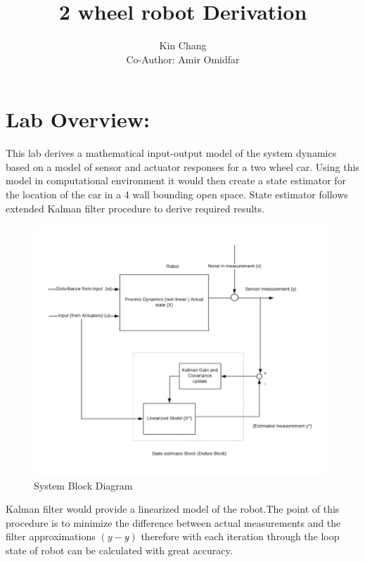\documentclass[12pt, letterpaper]{amsart} %
\author{Kin Chang \\Co-Author: 
Amir Omidfar}
\title{2 wheel robot Derivation}
\numberwithin{equation}{section}
\begin{document}
\maketitle
\pagebreak
\tableofcontents
\pagebreak
\section*{Lab Overview:}
This lab derives a mathematical input-output model of the system dynamics based on a model of sensor and actuator responses for a two wheel car. Using this model in computational environment it would then create a state estimator for the location of the car in a 4 wall bounding open space. State estimator follows extended Kalman filter procedure to derive required results.



\begin{figure}[h!]
\includegraphics[width=110mm]{fig_1.png}
\caption{System Block Diagram}
\label{fig:figure1}
\end{figure}

Kalman filter would provide a linearized model of the robot.The point of this procedure is to minimize the difference between actual measurements and the filter approximations $(y-y\hat{})$ therefore with each iteration through the loop state of robot can be calculated with great accuracy.   
\\
\newpage
\end{document}
